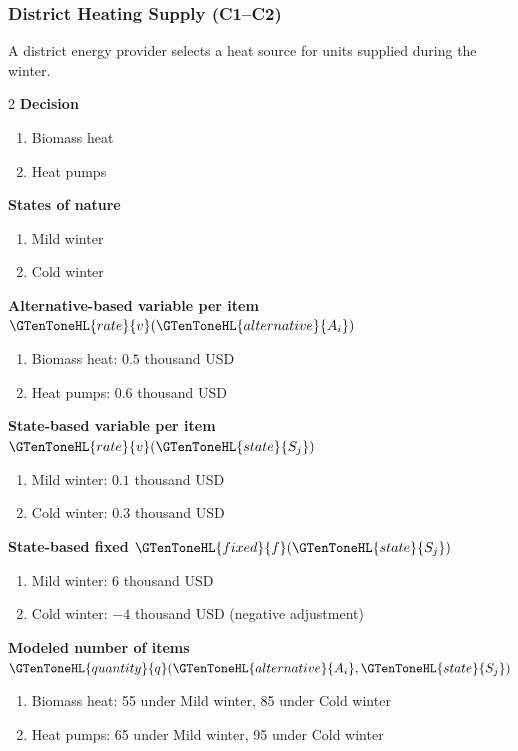 
	\subsubsection{District Heating Supply (C1--C2)}
	\label{sec:problem28-district-heating-supply-c1-c2}
	A district energy provider selects a heat source for units supplied during the winter.
	\begin{multicols}{2}
	\textbf{Decision }
	\begin{enumerate}[label=\arabic*.]
\item Biomass heat
\item Heat pumps
	\end{enumerate}
	\textbf{States of nature}
	\begin{enumerate}[label=\arabic*.]
\item Mild winter
\item Cold winter
	\end{enumerate}
	\columnbreak
	\textbf{Alternative-based variable  per item $\GTenToneHL{rate}{v}(\GTenToneHL{alternative}{A_i})$}
\begin{enumerate}[label=\arabic*.]
\item Biomass heat: $0.5$ thousand USD
\item Heat pumps: $0.6$ thousand USD\end{enumerate}
\textbf{State-based variable  per item $\GTenToneHL{rate}{v}(\GTenToneHL{state}{S_j})$}
\begin{enumerate}[label=\arabic*.]
\item Mild winter: $0.1$ thousand USD
\item Cold winter: $0.3$ thousand USD\end{enumerate}
\textbf{State-based fixed  $\GTenToneHL{fixed}{f}(\GTenToneHL{state}{S_j})$}
\begin{enumerate}[label=\arabic*.]
\item Mild winter: $6$ thousand USD
\item Cold winter: $-4$ thousand USD (negative adjustment)\end{enumerate}
\textbf{Modeled number of items $\GTenToneHL{quantity}{q}(\GTenToneHL{alternative}{A_i},\GTenToneHL{state}{S_j})$}
\begin{enumerate}[label=\arabic*.]
\item Biomass heat: 55 under Mild winter, 85 under Cold winter
\item Heat pumps: 65 under Mild winter, 95 under Cold winter
\end{enumerate}
	\end{multicols}

